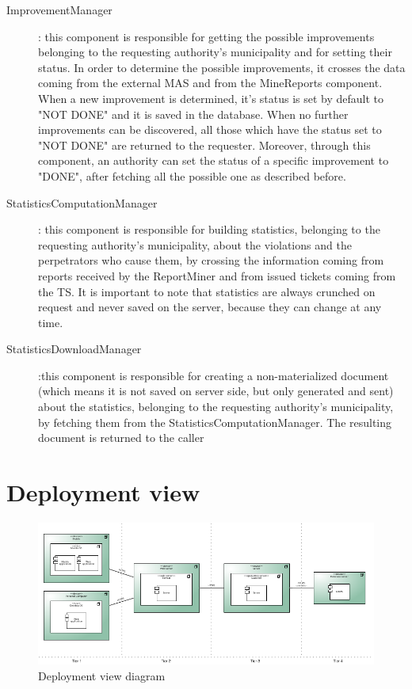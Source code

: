 \begin{description}
				\item[ImprovementManager]: this component is responsible for getting the possible improvements belonging to the requesting authority's municipality and for setting their status. In order to determine the possible improvements, it crosses the data coming from the external MAS and from the MineReports component. When a new improvement is determined, it's status is set by default to "NOT DONE" and it is saved in the database. When no further improvements can be discovered, all those which have the status set to "NOT DONE" are returned to the requester. Moreover, through this component, an authority can set the status of a specific improvement to "DONE", after fetching all the possible one as described before. 
				\item[StatisticsComputationManager]: this component is responsible for building statistics, belonging to the requesting authority's municipality, about the violations and the perpetrators who cause them, by crossing the information coming from reports received by the ReportMiner and from issued tickets coming from the TS. It is important to note that statistics are always crunched on request and never saved on the server, because they can change at any time.
				\item[StatisticsDownloadManager]:this component is responsible for creating a non-materialized document (which means it is not saved on server side, but only generated and sent) about the statistics, belonging to the requesting authority's municipality,  by fetching them from the StatisticsComputationManager. The resulting document is returned to the caller
			\end{description}
		\section{Deployment view}
			\begin{figure}[!h]
				\centering
				\includegraphics[width=\textwidth]{images/DD2/DeploymentView.pdf}
				\caption{Deployment view diagram}
			\end{figure}
